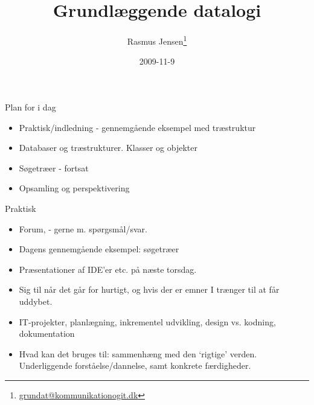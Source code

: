\documentclass[a4paper,landscape]{slides}
\title{Grundlæggende datalogi}
\author{Rasmus Jensen\footnote{\url{grundat@kommunikationogit.dk}}}
\date{2009-11-9}
\begin{document}
\maketitle
\begin{comment}
* Praktisk
** Forum, - gerne m. spørgsmål/svar.
** Dagens gennemgående eksempel: søgetræer
** Præsentationer af IDE'er etc. til næste torsdag.
** Sig til når det går for hurtigt, og hvis der er emner I trænger til at får uddybet.
** IT-projekter, planlægning, inkrementel udvikling, design vs. kodning, dokumentation 
** Hvad kan det bruges til: sammenhæng med den `rigtige' verden. Underliggende forståelse/dannelse, samt konkrete færdigheder.
* Databaser og træstrukturer. Klasser og objekter
** Tabeller vs. databaser
** Motivation: Databaser, hvordan fungerer de... Query optimiser, Indeks, 
** Start på eksempel med binære søgetræer.
** Design og overvejelser, træ-strukturer
* Søgetræer (fortsat)
** Praktisk implementation og test
** Unit-test, intern afprøvning
** API og afgrænsning
* Opsamling og perspektivering
** Databaser og søgetræer in real life, hukommelseshierakier
** Syntaks og semantik, standardiserede sprog, HTML vs. Python vs. SQL
** Modularisering af programmer, selvstændige dele.
\end{comment}
\begin{slide}
	\begin{center} {\large 
            Plan for i dag
	} \end{center}
	\begin{itemize} \addtolength{\itemsep}{-\baselineskip}
            \item Praktisk/indledning - gennemgående eksempel med træstruktur
            \item Databaser og træstrukturer. Klasser og objekter
            \item Søgetræer - fortsat
            \item Opsamling og perspektivering
	\end{itemize}
\end{slide}

\begin{slide}
	\begin{center} {\large 
            Praktisk
	} \end{center}
	\begin{itemize} \addtolength{\itemsep}{-\baselineskip}
                \item Forum, - gerne m. spørgsmål/svar. 
                \item Dagens gennemgående eksempel: søgetræer 
                \item Præsentationer af IDE'er etc. på næste torsdag. 
                \item Sig til når det går for hurtigt, og hvis der er emner I trænger til at får uddybet. 
                \item IT-projekter, planlægning, inkrementel udvikling, design vs. kodning, dokumentation 
                \item Hvad kan det bruges til: sammenhæng med den `rigtige' verden. Underliggende forståelse/dannelse, samt konkrete færdigheder. 
	\end{itemize}
\end{slide}
\end{document}
